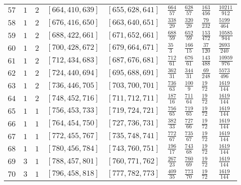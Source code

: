 \documentclass[12pt]{extarticle}
\begin{document}
\begin{longtable}{lllllllll}
$57$ & $1$ & $2$ & $\left[664, 410, 639\right]$ & $\left[655, 628, 641\right]$ & $\frac{664}{57}$ & $\frac{628}{57}$ & $\frac{163}{456}$ & $\frac{10211}{912}$ \\
$58$ & $1$ & $2$ & $\left[676, 416, 650\right]$ & $\left[663, 640, 651\right]$ & $\frac{338}{29}$ & $\frac{320}{29}$ & $\frac{79}{232}$ & $\frac{5199}{464}$ \\
$59$ & $1$ & $2$ & $\left[688, 422, 661\right]$ & $\left[671, 652, 661\right]$ & $\frac{688}{59}$ & $\frac{652}{59}$ & $\frac{153}{472}$ & $\frac{10585}{944}$ \\
$60$ & $1$ & $2$ & $\left[700, 428, 672\right]$ & $\left[679, 664, 671\right]$ & $\frac{35}{3}$ & $\frac{166}{15}$ & $\frac{37}{120}$ & $\frac{2693}{240}$ \\
$61$ & $1$ & $2$ & $\left[712, 434, 683\right]$ & $\left[687, 676, 681\right]$ & $\frac{712}{61}$ & $\frac{676}{61}$ & $\frac{143}{488}$ & $\frac{10959}{976}$ \\
$62$ & $1$ & $2$ & $\left[724, 440, 694\right]$ & $\left[695, 688, 691\right]$ & $\frac{362}{31}$ & $\frac{344}{31}$ & $\frac{69}{248}$ & $\frac{5573}{496}$ \\
$63$ & $1$ & $2$ & $\left[736, 446, 705\right]$ & $\left[703, 700, 701\right]$ & $\frac{736}{63}$ & $\frac{100}{9}$ & $\frac{19}{72}$ & $\frac{1619}{144}$ \\
$64$ & $1$ & $2$ & $\left[748, 452, 716\right]$ & $\left[711, 712, 711\right]$ & $\frac{187}{16}$ & $\frac{711}{64}$ & $\frac{19}{72}$ & $\frac{1619}{144}$ \\
$65$ & $1$ & $1$ & $\left[756, 453, 733\right]$ & $\left[719, 724, 721\right]$ & $\frac{756}{65}$ & $\frac{719}{65}$ & $\frac{19}{72}$ & $\frac{1619}{144}$ \\
$66$ & $1$ & $1$ & $\left[764, 454, 750\right]$ & $\left[727, 736, 731\right]$ & $\frac{382}{33}$ & $\frac{727}{66}$ & $\frac{19}{72}$ & $\frac{1619}{144}$ \\
$67$ & $1$ & $1$ & $\left[772, 455, 767\right]$ & $\left[735, 748, 741\right]$ & $\frac{772}{67}$ & $\frac{735}{67}$ & $\frac{19}{72}$ & $\frac{1619}{144}$ \\
$68$ & $1$ & $1$ & $\left[780, 456, 784\right]$ & $\left[743, 760, 751\right]$ & $\frac{196}{17}$ & $\frac{743}{68}$ & $\frac{19}{72}$ & $\frac{1619}{144}$ \\
$69$ & $3$ & $1$ & $\left[788, 457, 801\right]$ & $\left[760, 771, 762\right]$ & $\frac{267}{23}$ & $\frac{760}{69}$ & $\frac{19}{72}$ & $\frac{1619}{144}$ \\
$70$ & $3$ & $1$ & $\left[796, 458, 818\right]$ & $\left[777, 782, 773\right]$ & $\frac{409}{35}$ & $\frac{773}{70}$ & $\frac{19}{72}$ & $\frac{1619}{144}$ \\

\end{longtable}
\end{document}
